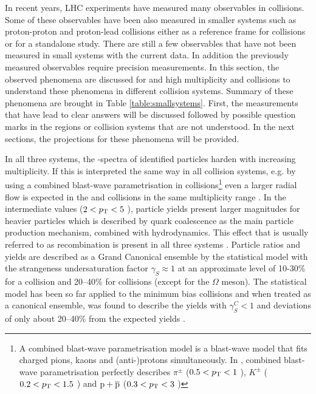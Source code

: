 \documentclass[../report.tex]{subfiles}
\begin{document}
In recent years, LHC experiments have measured many observables in \PbPb collisions. Some of these observables have been also measured in smaller systems such as proton-proton and proton-lead collisions either as a reference frame for \PbPb collisions or for a standalone study. There are still a few observables that have not been measured in small systems with the current data. In addition the previously measured observables require precision measurements. In this section, the observed phenomena are discussed for \PbPb and high multiplicity \pPb and \pp collisions to understand these phenomena in different collision systems. Summary of these phenomena are brought in Table \ref{table:smallsystems}. First, the measurements that have lead to clear answers will be discussed followed by possible question marks in the regions or collision systems that are not understood. In the next sections, the projections for these phenomena will be provided.

In all three systems, the \pT-spectra of identified particles harden with increasing multiplicity. If this is interpreted the same way in all collision systems, e.g. by using a combined blast-wave parametrisation in \PbPb collisions\footnote{A combined blast-wave parametrisation model is a blast-wave model that fits charged pions, kaons and (anti-)protons simultaneously. In \cite{Abelev:2012wca}, combined blast-wave parametrisation perfectly describes $\pi^{\pm}$ ($ 0.5 < p\sb{\scriptstyle\mathrm{T}} < 1$ \UGeVc), $K^{\pm}$ ($ 0.2 < p\sb{\scriptstyle\mathrm{T}} < 1.5$ \UGeVc) and ${\rm p}+\overline{\rm{p}}$ ($ 0.3 < p\sb{\scriptstyle\mathrm{T}} < 3$ \UGeVc)} even a larger radial flow is expected in the \pp and \pPb collisions in the same multiplicity range \cite{Shuryak:2013ke}. In the intermediate \pT values ($2 < p\sb{\scriptstyle\mathrm{T}} < 5 $ \UGeVc), particle yields present larger magnitudes for heavier particles which is described by quark coalescence as the main particle production mechanism, combined with hydrodynamics. This effect that is usually referred to as recombination is present in all three systems \cite{Andrei:2014vaa,Abelev:2013xaa,Abelev:2013haa,Abelev:2014uua,Khachatryan:2016yru,Adam:2015jca,Adam:2016dau,Adam:2017zbf}. Particle ratios and yields are described as a Grand Canonical ensemble by the statistical model with the strangeness undersaturation factor $\gamma_{S}\approx 1$ at an approximate level of 10-30\% for a \PbPb{} collision and 20--40\% for \pPb{} collisions (except for the $\Omega$ meson). The statistical model has been so far applied to the minimum bias \pp collisions and when treated as a canonical ensemble, was found to describe the yields with $\gamma^{C}_{S} < 1$ and deviations of only about 20--40\% from the expected yields \cite{Adam:2016emw,Adam:2016bpr,Adam:2015vsf,ABELEV:2013zaa}.
\end{document}
